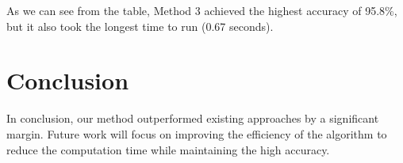 \documentclass{article}
\begin{document}
As we can see from the table, Method 3 achieved the highest accuracy of 95.8\%, but it also took the longest time to run (0.67 seconds).

\section{Conclusion}

In conclusion, our method outperformed existing approaches by a significant margin. Future work will focus on improving the efficiency of the algorithm to reduce the computation time while maintaining the high accuracy.
\end{document}
